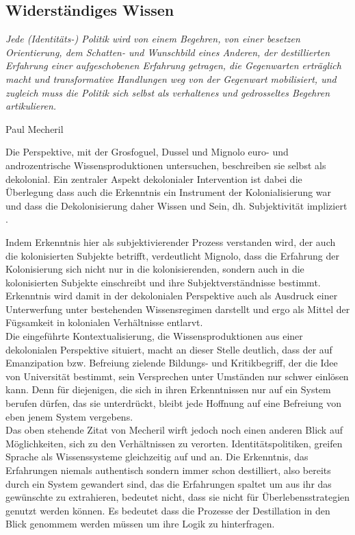 \subsection{Widerständiges Wissen}
\epigraph{\textit{ 
Jede (Identitäts-) Politik wird von einem Begehren, von einer besetzen
Orientierung, dem Schatten- und Wunschbild eines Anderen, der destillierten
Erfahrung einer aufgeschobenen Erfahrung getragen, die Gegenwarten erträglich
macht und transformative Handlungen weg von der Gegenwart mobilisiert, und
zugleich muss die Politik sich selbst als verhaltenes und gedrosseltes Begehren
artikulieren.
  }}{Paul Mecheril \footnotemark}  

Die Perspektive, mit der Grosfoguel, Dussel und Mignolo euro- und
androzentrische Wissensproduktionen untersuchen, beschreiben sie selbst als
dekolonial. Ein zentraler Aspekt dekolonialer Intervention ist dabei die
Überlegung \glqq dass auch die Erkenntnis ein Instrument der Kolonialisierung war
und dass die Dekolonisierung daher Wissen und Sein, dh. Subjektivität
impliziert \grqq. \footnotemark {}

Indem Erkenntnis hier als subjektivierender Prozess verstanden wird, der auch
die kolonisierten Subjekte betrifft, verdeutlicht Mignolo, dass die Erfahrung
der Kolonisierung sich nicht nur in die kolonisierenden, sondern auch in die
kolonisierten Subjekte einschreibt und ihre Subjektverständnisse bestimmt.
Erkenntnis wird damit in der dekolonialen Perspektive auch als Ausdruck einer
Unterwerfung unter bestehenden Wissensregimen darstellt und ergo als Mittel
der Fügsamkeit in kolonialen Verhältnisse entlarvt. 
\\

Die eingeführte Kontextualisierung, die Wissensproduktionen aus einer
dekolonialen Perspektive situiert, macht an dieser Stelle deutlich, dass der
auf Emanzipation bzw. Befreiung zielende Bildungs- und Kritikbegriff, der die
Idee von Universität bestimmt, sein Versprechen unter Umständen nur schwer
einlösen kann. Denn für diejenigen, die sich in ihren Erkenntnissen nur auf
ein System berufen dürfen, das sie unterdrückt, bleibt jede Hoffnung auf eine
Befreiung von eben jenem System vergebens. \\
Das oben stehende Zitat von Mecheril
wirft jedoch noch einen anderen Blick auf Möglichkeiten, sich zu den
Verhältnissen zu verorten. Identitätspolitiken, greifen Sprache als
Wissenssysteme gleichzeitig auf und an. Die Erkenntnis, das Erfahrungen niemals
authentisch sondern immer schon destilliert, also bereits durch ein System
gewandert sind, das die Erfahrungen spaltet um aus ihr das gewünschte zu
extrahieren, bedeutet nicht, dass sie nicht für Überlebensstrategien genutzt
werden können. Es bedeutet dass die Prozesse der Destillation in den Blick
genommem werden müssen um ihre Logik zu hinterfragen.
\\


